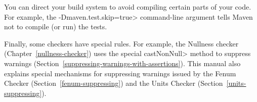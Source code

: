 You can direct your build system to avoid compiling certain parts of your
code.  For example, the \<-Dmaven.test.skip=true> command-line argument
tells Maven not to compile (or run) the tests.



Finally, some checkers have special rules.  For example, the Nullness
checker (Chapter~\ref{nullness-checker}) uses
the special \<castNonNull> method to suppress warnings
(Section~\ref{suppressing-warnings-with-assertions}).
This manual also explains special mechanisms for
suppressing warnings issued by the Fenum Checker
(Section~\ref{fenum-suppressing}) and the Units Checker
(Section~\ref{units-suppressing}).


